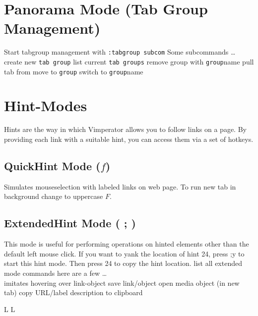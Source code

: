 \section{Panorama Mode (Tab Group Management)}{Start tabgroup management with {\tt :tabgroup subcom}}
Some subcommands \ldots \\
	{create new {\tt tab group}}
	{list current {\tt tab groups}}
	{remove group with {\tt group}name}
	{pull tab from \or move to {\tt group}}
	{switch to {\tt group}name}




\section{Hint-Modes}{Hints are the way in which Vimperator allows you to follow links on a page. By
providing each link with a suitable hint, you can access them via a set of hotkeys. }
\subsection{QuickHint Mode ($f$)}{Simulates mouseselection with labeled
links on web page. To run new tab in background change to uppercase $F$.}
\subsection{ExtendedHint Mode ( ; )}{This mode is useful for
performing operations on hinted elements other than the default
left mouse click. If you want to yank the location of hint 24, press ;y to start this hint
mode. Then press 24 to copy the hint location.}
	{list all extended mode commands}
here are a few \ldots\\
\cmdS{;~}	{imitates hovering over link-object}
	{save link/object}
	{open media object (in new tab)}
	{copy URL/label description to clipboard}

\copyrightnotice
%


\vfil
\supereject
\if L\lr \else\null\vfill\eject\fi
\if L\lr \else\null\vfill\eject\fi
\bye

